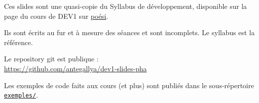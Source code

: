 \begin{frame}[plain]
  \titlepage
\end{frame}


\begin{frame}
  Ces slides sont une quasi-copie du Syllabus de développement, disponible sur
  la page du cours de DEV1 sur \href{https://poesi.esi-bru.be}{poési}.

  Ils sont écrits au fur et à mesure des séances et sont incomplets. Le
  syllabus est la référence.

  Le repository git est publique :\\
  \url{https://github.com/antegallya/dev1-slides-pha}

  Les exemples de code faits aux cours (et plus) sont publiés dans le
  sous-répertoire \href{https://github.com/antegallya/dev1-slides-pha/tree/master/exemples}
  {\texttt{exemples/}}.

\end{frame}
